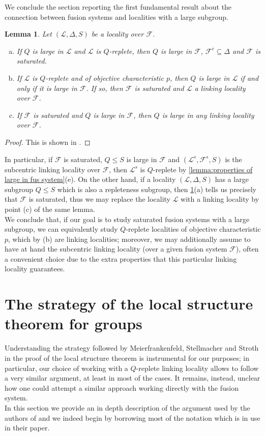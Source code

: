 \documentclass{amsart}
\numberwithin{equation}{section}
\newtheorem{lemma}[equation]{Lemma}
\theoremstyle{definition}
\theoremstyle{subresult}
\theoremstyle{caseresult}
\newcommand{\F}{\mathcal{F}}
\renewcommand{\L}{\mathcal{L}}
\newcommand{\<}{\langle}
\renewcommand{\>}{\rangle}
\begin{document}
\space{0.4cm}
We conclude the section reporting the first fundamental result about the connection between fusion systems and localities with a large subgroup.
\begin{lemma}\label{lemma:large for fus systems and localities}
    Let $(\L,\Delta,S)$ be a locality over $\F$.
    \begin{enumerate}[(a)]
        \item If $Q$ is large in $\L$ and $\L$ is $Q$-replete, then $Q$ is large in $\F$, $\F^c \subseteq \Delta$ and $\F$ is saturated.
        \item If $\L$ is $Q$-replete and of objective characteristic $p$, then $Q$ is large in $\L$ if and only if it is large in $\F$. If so, then $\F$ is saturated and $\L$ a linking locality over $\F$.
        \item If $\F$ is saturated and $Q$ is large in $\F$, then $Q$ is large in any linking locality over $\F$.
    \end{enumerate}
\end{lemma}
\begin{proof}
    This is shown in \cite[Lemma 4.10]{Henke-Salati:2026}.
\end{proof}

In particular, if $\F$ is saturated, $Q \le S$ is large in $\F$ and $(\L^s, \F^s, S)$ is the subcentric linking locality over $\F$, then $\L^s$ is $Q$-replete by \ref{lemma:properties of large in fus system}(e). On the other hand, if a locality $(\L,\Delta,S)$ has a large subgroup $Q \le S$ which is also a repleteness subgroup, then \ref{lemma:large for fus systems and localities}(a) tells us precisely that $\F$ is saturated, thus we may replace the locality $\L$ with a linking locality by point (c) of the same lemma.\\
We conclude that, if our goal is to study saturated fusion systems with a large subgroup, we can equivalently study $Q$-replete localities of objective characteristic $p$, which by (b) are linking localities; moreover, we may additionally assume to have at hand the subcentric linking locality (over a given fusion system $\F$), often a convenient choice due to the extra properties that this particular linking locality guarantees.



\section{The strategy of the local structure theorem for groups} \label{section: strategy of LST for groups}
Understanding the strategy followed by Meierfrankenfeld, Stellmacher and Stroth in the proof of the local structure theorem is instrumental for our purposes; in particular, our choice of working with a $Q$-replete linking locality allows to follow a very similar argument, at least in most of the cases. It remains, instead, unclear how one could attempt a similar approach working directly with the fusion system.\\
In this section we provide an in depth description of the argument used by the authors of \cite{Meier-Stell-Stroth:2012} and we indeed begin by borrowing most of the notation which is in use in their paper.
\end{document}
